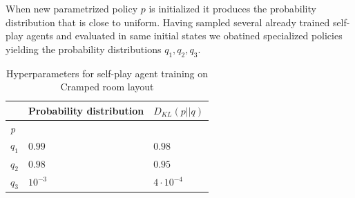 When new parametrized policy $p$ is initialized it produces the probability distribution that is close to uniform.
Having sampled several already trained self-play agents and evaluated in same initial states we obatined specialized policies yielding the probability distributions $q_1, q_2, q_3$.


\begin{table}[htbp]
    \small
    \centering
    \begin{tabular}{lll}
      \toprule
      \                                & Probability distribution     & $D_{KL}(p||q)$         \\ \midrule
      \textit{p}     &                                   &                                   \\ \midrule            
      $q_1$                     & $0.99$                            & $0.98$                            \\
      $q_2$                         & $0.98$                            & $0.95$                            \\
      $q_3$                                & $10^{-3}$                         & $4 \cdot 10^{-4}$                               \\
      
     \bottomrule
    \end{tabular}
    \caption{Hyperparameters for self-play agent training on Cramped room layout}
    \label{tab:KLDiv-coefiicents}
  \end{table}




